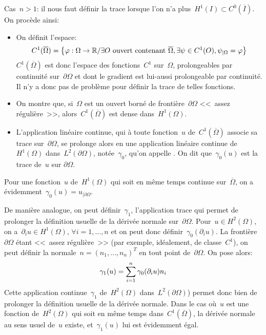 \medskip
Cas~$n>1$:
il nous faut définir la trace lorsque l'on n'a plus~$H^1(I)\subset C^0(\overline{I})$.
On procède ainsi:
\begin{itemize}
  \item On définit l'espace:
	\begin{equation}C^1(\overline{\Omega}) = \left\{\varphi:\Omega\rightarrow\mathbb R/ \exists O
	\text{ ouvert contenant } \overline{\Omega}, \exists \psi\in C^1(O), \psi_{|\Omega}=\varphi
	\right\}\end{equation}
	$C^1(\overline{\Omega})$ est donc l'espace des fonctions~$C^1$ sur~$\Omega$, prolongeables
	par continuité sur~$\partial\Omega$ et dont le gradient est lui-aussi prolongeable par continuité.
	Il n'y a donc pas de problème pour définir la trace de telles fonctions.
  \item On montre que, si~$\Omega$ est un ouvert borné de frontière~$\partial\Omega$
	<<~assez régulière~>>, alors~$C^1(\overline{\Omega})$ est dense dans~$H^1(\Omega)$.
  \item L'application linéaire continue, qui à toute fonction~$u$ de~$C^1(\overline{\Omega})$
	associe sa trace sur~$\partial\Omega$, se prolonge alors en une application linéaire continue
	de~$H^1(\Omega)$ dans~$L^2(\partial\Omega)$, notée~$\gamma_0$, qu'on appelle
	. On dit que~$\gamma_0(u)$ est la trace de~$u$ sur
	$\partial\Omega$.
\end{itemize}
Pour une fonction~$u$ de~$H^1(\Omega)$ qui soit en même temps continue sur~$\overline{\Omega}$,
on a évidemment~$\gamma_0(u) = u_{|\partial\Omega}$. 

\medskip
De manière analogue, on peut définir~$\gamma_1$, l'application trace qui permet de
prolonger la définition usuelle de la dérivée normale sur~$\partial\Omega$.
Pour~$u\in H^2(\Omega)$, on a~$\partial_iu\in H^1(\Omega)$, $\forall i=1,\ldots,n$ et
on peut donc définir~$\gamma_0(\partial_iu)$. La frontière~$\partial\Omega$
étant <<~assez régulière~>> (par exemple, idéalement, de classe~$C^1$),
on peut définir la normale~$n = (n_1,\ldots,n_n)^T$ en tout point de~$\partial\Omega$.
On pose alors:
\begin{equation}\gamma_1(u) = \displaystyle\sum_{i=1}^n \gamma_0(\partial_iu)n_i\end{equation}
Cette application continue~$\gamma_1$ de~$H^2(\Omega)$ dans~$L^2(\partial\Omega)$)
permet donc bien de prolonger la définition usuelle de la dérivée normale.
Dans le cas où~$u$ est une fonction de~$H^2(\Omega)$ qui soit en même temps
dans~$C^1(\overline{\Omega})$, la dérivée normale au sens usuel de~$u$ existe,
et~$\gamma_1(u)$ lui est évidemment égal.

